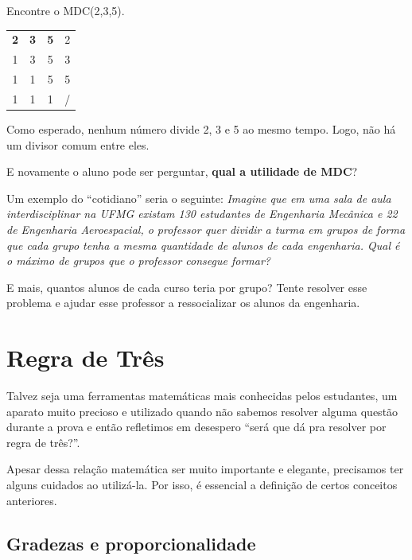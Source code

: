 \begin{exemplo}
    Encontre o MDC(2,3,5).

    \begin{table}[H]
    \centering
    \begin{tabular}{ccc|c}
        \textbf{2} & \textbf{3} & \textbf{5} & 2\\
        1 & 3 & 5 & 3\\
        1 & 1 & 5 & 5\\
        1 & 1 & 1 & /\\
    \end{tabular}
    \end{table}

    Como esperado, nenhum número divide 2, 3 e 5 ao mesmo tempo. Logo, não há um divisor comum entre eles.
\end{exemplo}

E novamente o aluno pode ser perguntar, \textbf{qual a utilidade de MDC}? 

Um exemplo do ``cotidiano'' seria o seguinte: \textit{Imagine que em uma sala de aula interdisciplinar na UFMG existam 130 estudantes de Engenharia Mecânica e 22 de Engenharia Aeroespacial, o professor quer dividir a turma em grupos de forma que cada grupo tenha a mesma quantidade de alunos de cada engenharia. Qual é o máximo de grupos que o professor consegue formar?}

E mais, quantos alunos de cada curso teria por grupo? Tente resolver esse problema e ajudar esse professor a ressocializar os alunos da engenharia.

\newpage

\section{Regra de Três}
Talvez seja uma ferramentas matemáticas mais conhecidas pelos estudantes, um aparato muito precioso e utilizado quando não sabemos resolver alguma questão durante a prova e então refletimos em desespero ``será que dá pra resolver por regra de três?''.

Apesar dessa relação matemática ser muito importante e elegante, precisamos ter alguns cuidados ao utilizá-la. Por isso, é essencial a definição de certos conceitos anteriores.

\subsection{Gradezas e proporcionalidade}

